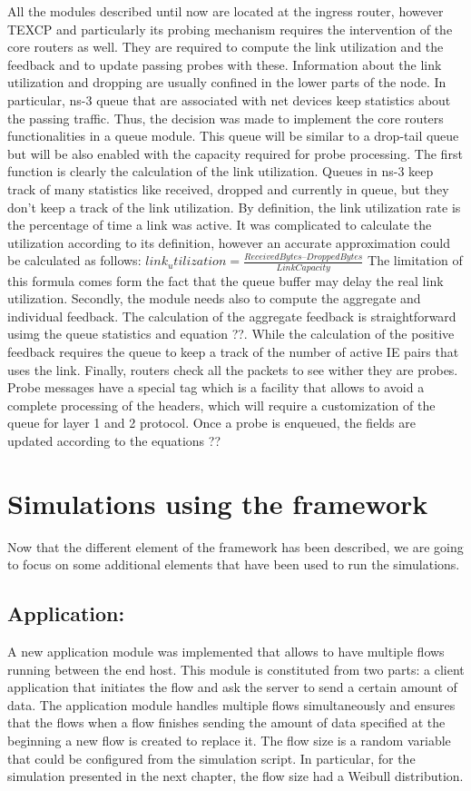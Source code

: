 All the modules described until now are located at the ingress router, however TEXCP and particularly its probing mechanism requires the intervention of the core routers as well. They are required to compute the link utilization and the feedback and to update passing probes with these. Information about the link utilization and dropping are usually confined in the lower parts of the node. In particular, ns-3 queue that are associated with net devices keep statistics about the passing traffic. Thus, the decision was made to implement the core routers functionalities in a queue module. This queue will be similar to a drop-tail queue but will be also enabled with the capacity required for probe processing. The first function is clearly the calculation of the link utilization. Queues in ns-3 keep track of many statistics like received, dropped and currently in queue, but they don't keep a track of the link utilization. By definition, the link utilization rate is the percentage of time a link was active. It was complicated to calculate the utilization according to its definition, however an accurate approximation could be calculated as follows:
$link_utilization = \frac{ReceivedBytes – DroppedBytes}{LinkCapacity}$
The limitation of this formula comes form the fact that the queue buffer may delay the real link utilization.
Secondly, the module needs also to compute the aggregate and individual feedback. The calculation of the aggregate feedback is straightforward usimg the queue statistics and equation ??. While the calculation of the positive feedback requires the queue to keep a track of the number of active IE pairs that uses the link.
Finally, routers check all the packets to see wither they are probes. Probe messages have a special tag which is a facility that allows to avoid a complete processing  of the headers, which will require a customization of the queue for layer 1 and 2 protocol. Once a probe is enqueued, the fields are updated according to the equations ??

\section{Simulations using the framework}
Now that the different element of the framework has been described, we are going to focus on some additional elements that have been used to run the simulations.

\subsection{Application: }
A new application module was implemented that allows to have multiple flows running between the end host. This module is constituted from two parts: a client application that initiates the flow and ask the server to send a certain amount of data. The application module handles multiple flows simultaneously and ensures that the flows when a flow finishes sending the amount of data specified at the beginning a new flow is created to replace it. The flow size is a random variable that could  be configured from the simulation script. In particular, for the simulation presented in the next chapter, the flow size had  a Weibull distribution.

